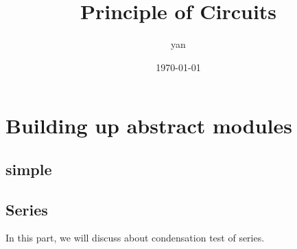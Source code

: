 \documentclass{book}
\title{Principle of Circuits}
\author{yan}
\date{\today}
\begin{document}
\frontmatter
\maketitle
\tableofcontents

\mainmatter
\part{Building up abstract modules}
\chapter{simple }
\chapter{Series}

In this part, we will discuss about condensation test of series.
\end{document}
